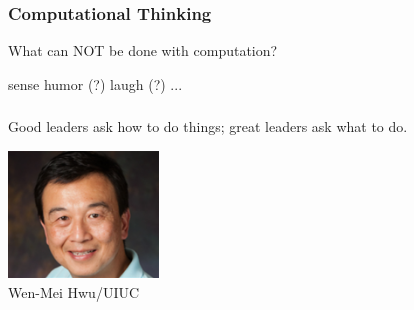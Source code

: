 \documentclass[11pt]{beamer}
\begin{document}
\begin{frame}
	\frametitle{Computational Thinking}
	\Enlarge
	\begin{itemize}
		\myitem What can NOT be done with computation? \pause
        \begin{itemize}
    		\mysubitem sense humor (?)\pause
            \mysubitem laugh (?)
            \mysubitem ...
        \end{itemize}
	\end{itemize}
	
\end{frame}

\begin{frame}
	\frametitle{}
	\Enlarge
	\vspace{5mm}
	Good leaders ask how to do things; great leaders ask what to do.
	
	\vspace{2mm}
	\hfill \includegraphics[width=0.3\textwidth]{./img/wenmei.png} \hspace{10mm} \\
	\small \hfill Wen-Mei Hwu/UIUC\\
\end{frame}
\end{document}
